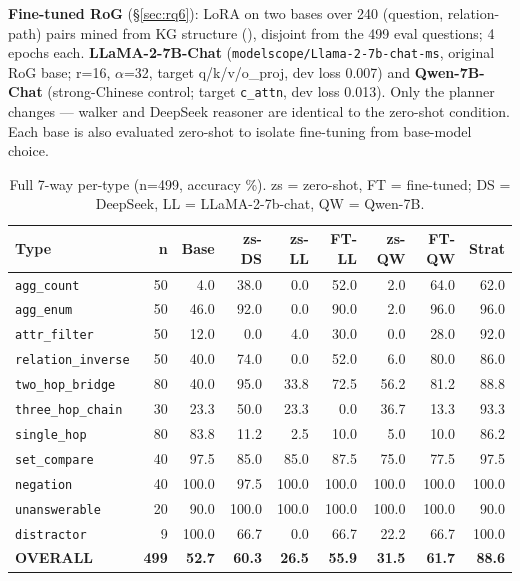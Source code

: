 \documentclass[11pt,a4paper]{article}
\newcommand{\qtype}[1]{\texttt{\small #1}}
\begin{document}
\textbf{Fine-tuned RoG} (§\ref{sec:rq6}): LoRA on two bases over 240 (question, relation-path) pairs mined from KG structure (), disjoint from the 499 eval questions; 4 epochs each. \textbf{LLaMA-2-7B-Chat} (\texttt{modelscope/Llama-2-7b-chat-ms}, original RoG base; r=16, $\alpha$=32, target q/k/v/o\_proj, dev loss 0.007) and \textbf{Qwen-7B-Chat} (strong-Chinese control; target \texttt{c\_attn}, dev loss 0.013). Only the planner changes --- walker and DeepSeek reasoner are identical to the zero-shot condition. Each base is also evaluated zero-shot to isolate fine-tuning from base-model choice.

\begin{table}[t]
\centering
\small
\caption{Full 7-way per-type (n=499, accuracy \%). zs = zero-shot, FT = fine-tuned; DS = DeepSeek, LL = LLaMA-2-7b-chat, QW = Qwen-7B.}
\label{tab:rog5way}
\setlength{\tabcolsep}{3.5pt}
\begin{tabular}{l r r r r r r r r}
\toprule
\textbf{Type} & \textbf{n} & \textbf{Base} & \textbf{zs-DS} & \textbf{zs-LL} & \textbf{FT-LL} & \textbf{zs-QW} & \textbf{FT-QW} & \textbf{Strat} \\
\midrule
\qtype{agg\_count}        & 50 & 4.0  & 38.0 & 0.0   & 52.0 & 2.0   & 64.0 & 62.0 \\
\qtype{agg\_enum}         & 50 & 46.0 & 92.0 & 0.0   & 90.0 & 2.0   & 96.0 & 96.0 \\
\qtype{attr\_filter}      & 50 & 12.0 & 0.0  & 4.0   & 30.0 & 0.0   & 28.0 & 92.0 \\
\qtype{relation\_inverse} & 50 & 40.0 & 74.0 & 0.0   & 52.0 & 6.0   & 80.0 & 86.0 \\
\qtype{two\_hop\_bridge}  & 80 & 40.0 & 95.0 & 33.8  & 72.5 & 56.2  & 81.2 & 88.8 \\
\qtype{three\_hop\_chain} & 30 & 23.3 & 50.0 & 23.3  & 0.0  & 36.7  & 13.3 & 93.3 \\
\qtype{single\_hop}       & 80 & 83.8 & 11.2 & 2.5   & 10.0 & 5.0   & 10.0 & 86.2 \\
\qtype{set\_compare}      & 40 & 97.5 & 85.0 & 85.0  & 87.5 & 75.0  & 77.5 & 97.5 \\
\qtype{negation}          & 40 & 100.0& 97.5 & 100.0 & 100.0& 100.0 & 100.0& 100.0 \\
\qtype{unanswerable}      & 20 & 90.0 & 100.0& 100.0 & 100.0& 100.0 & 100.0& 90.0 \\
\qtype{distractor}        & 9  & 100.0& 66.7 & 0.0   & 66.7 & 22.2  & 66.7 & 100.0 \\
\midrule
\textbf{OVERALL} & \textbf{499} & \textbf{52.7} & \textbf{60.3} & \textbf{26.5} & \textbf{55.9} & \textbf{31.5} & \textbf{61.7} & \textbf{88.6} \\
\bottomrule
\end{tabular}
\end{table}
\end{document}
